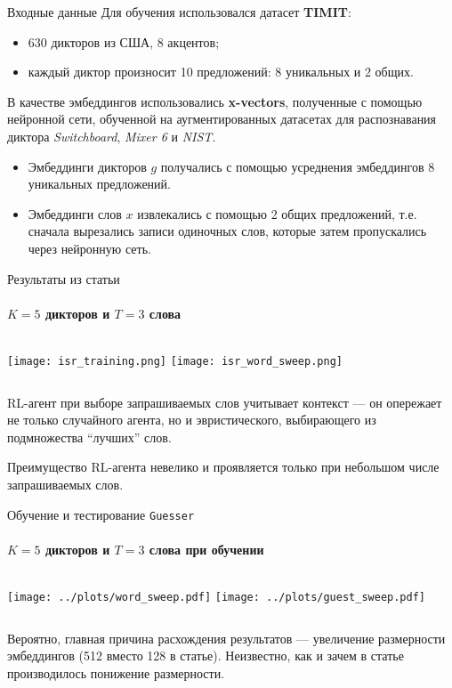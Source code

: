 \documentclass[aspectratio=169]{beamer}
\newcommand{\guesser}{\texttt{Guesser}}
\newcommand{\imgscale}{0.8}
\begin{document}
\begin{frame}{Входные данные}
    Для обучения использовался датасет \textbf{TIMIT}:
    \begin{itemize}
        \item 630 дикторов из США, 8 акцентов;
        \item каждый диктор произносит 10 предложений: 8 уникальных и 2 общих.
    \end{itemize}

    В качестве эмбеддингов использовались \textbf{x-vectors}, полученные с помощью нейронной сети, обученной на аугментированных датасетах для распознавания диктора \textit{Switchboard}, \textit{Mixer 6} и \textit{NIST}.
    \begin{itemize}
        \item Эмбеддинги дикторов $g$ получались с помощью усреднения
        эмбеддингов 8 уникальных предложений.
        \item Эмбеддинги слов $x$ извлекались с помощью 2 общих предложений,
        т.е. сначала вырезались записи одиночных слов, которые затем
        пропускались через нейронную сеть.
    \end{itemize}
\end{frame}

\begin{frame}{Результаты из статьи}
    \framesubtitle{$K = 5$ дикторов и $T = 3$ слова}
    \begin{columns}
        \centering
        \texttt{[image: isr\_training.png]}
        \texttt{[image: isr\_word\_sweep.png]}
    \end{columns}\vspace*{1em}

    RL-агент при выборе запрашиваемых слов учитывает контекст --- он опережает
    не только случайного агента, но и эвристического, выбирающего из
    подмножества ``лучших'' слов.\vspace*{1em}

    Преимущество RL-агента невелико и проявляется только при небольшом числе
    запрашиваемых слов.
\end{frame}

\begin{frame}[t]{Обучение и тестирование \guesser{}}
    \framesubtitle{$K = 5$ дикторов  и $T = 3$ слова при обучении}
    \begin{columns}
        \centering
        \texttt{[image: ../plots/word\_sweep.pdf]}
        \texttt{[image: ../plots/guest\_sweep.pdf]}
    \end{columns}\vspace*{1em}

    Вероятно, главная причина расхождения результатов --- увеличение размерности
    эмбеддингов (512 вместо 128 в статье). Неизвестно, как и зачем в статье
    производилось понижение размерности.
\end{frame}
\end{document}
